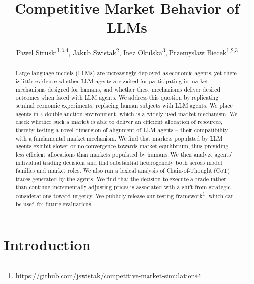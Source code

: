 \documentclass[letterpaper]{article} %
\title{Competitive Market Behavior of LLMs}
\author{
    Pawel Struski\textsuperscript{\rm 1,\rm 3,\rm 4}\corresponding,
    Jakub Swistak\textsuperscript{\rm 2},
    Inez Okulska\textsuperscript{\rm 3},
    Przemyslaw Biecek\textsuperscript{\rm 1,\rm 2,\rm 3}
}
\begin{document}
\maketitle

\begin{abstract}
Large language models (LLMs) are increasingly deployed as economic agents, yet there is little evidence whether LLM agents are suited for participating in market mechanisms designed for humans, and whether these mechanisms deliver desired outcomes when faced with LLM agents. We address this question by replicating seminal economic experiments, replacing human subjects with LLM agents. We place agents in a double auction environment, which is a widely-used market mechanism. We check whether such a market is able to deliver an efficient allocation of resources, thereby testing a novel dimension of alignment of LLM agents -- their compatibility with a fundamental market mechanism. We find that markets populated by LLM agents exhibit slower or no convergence towards market equilibrium, thus providing less efficient allocations than markets populated by humans. We then analyze agents' individual trading decisions and find substantial heterogeneity both across model families and market roles. We also run a lexical analysis of Chain-of-Thought (CoT) traces generated by the agents. We find that the decision to execute a trade rather than continue incrementally adjusting prices is associated with a shift from strategic considerations toward urgency. We publicly release our testing framework\footnote{\url{https://github.com/jswistak/competitive-market-simulation}}, which can be used for future evaluations.

\end{abstract}

%
%
%
%
%
%
%
%

\section{Introduction}
\end{document}
